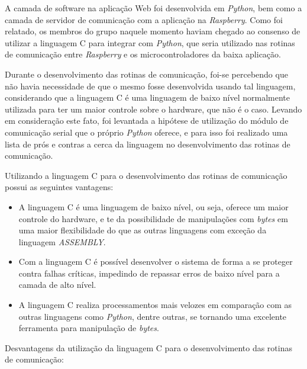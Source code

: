 A camada de software na aplicação Web foi desenvolvida em \textit{Python}, bem como a camada de servidor de comunicação com a aplicação na 
\textit{Raspberry}. Como foi relatado, os membros do grupo naquele momento haviam chegado ao consenso de utilizar a linguagem C para integrar 
com \textit{Python}, que seria utilizado nas rotinas de comunicação entre \textit{Raspberry} e os microcontroladores da baixa aplicação.

Durante o desenvolvimento das rotinas de comunicação, foi-se percebendo que não havia necessidade de que o mesmo fosse desenvolvida 
usando tal linguagem, considerando que a linguagem C é uma linguagem de baixo nível normalmente utilizada para ter um maior controle sobre o 
hardware, que não é o caso. Levando em consideração este fato, foi levantada a hipótese de utilização do módulo de comunicação serial que o próprio 
\textit{Python} oferece, e para isso foi realizado uma lista de prós e contras a cerca da linguagem no desenvolvimento das rotinas de comunicação.

Utilizando a linguagem C para o desenvolvimento das rotinas de comunicação possui as seguintes vantagens:

\begin{itemize}
    \item A linguagem C é uma linguagem de baixo nível, ou seja, oferece um maior controle do hardware, e te da possibilidade de manipulações com \textit{bytes} em uma maior flexibilidade do que as outras linguagens com exceção da linguagem \textit{ASSEMBLY}.
    \item Com a linguagem C é possível desenvolver o sistema de forma a se proteger contra falhas críticas, impedindo de repassar erros de baixo nível para a camada de alto nível.
    \item A linguagem C realiza processamentos mais velozes em comparação com as outras linguagens como \textit{Python}, dentre outras, se tornando uma excelente ferramenta para manipulação de \textit{bytes}.
\end{itemize}

Desvantagens da utilização da linguagem C para o desenvolvimento das rotinas de comunicação:

